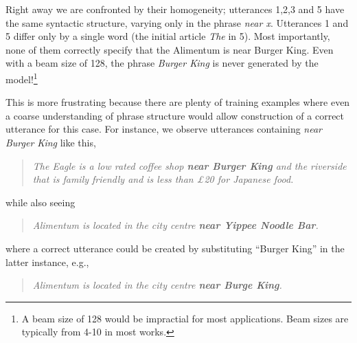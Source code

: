 \begin{enumerate}
%
\end{enumerate}
Right away we are confronted by their homogeneity; utterances 1,2,3 and 5
have the same syntactic structure, varying only in the phrase \textit{near x}.
Utterances 1 and 5 differ only by a single word (the initial article \textit{The} in 5).  Most importantly, none of them correctly specify that the Alimentum 
is near Burger King. Even with a beam size of 128, the phrase \textit{Burger King} is never generated by the model!\footnote{A beam size of 128 would be impractial for most applications. Beam sizes are typically from 4-10 in most works.}



This is more frustrating because there are plenty of training examples where
even a coarse understanding of phrase structure would allow construction
of a correct utterance for this case.
For instance, we observe utterances containing \textit{near Burger King}
like this,
\begin{quotation}
\noindent \textit{The Eagle is a low rated coffee shop \textbf{near Burger King}
and the riverside that is family friendly and is less than £20
for Japanese food.}
\end{quotation}
while also seeing
\begin{quotation}
\noindent \textit{Alimentum is located in the city centre \textbf{near Yippee Noodle Bar}. \textellipsis}
\end{quotation}
where a correct utterance could be created by substituting ``Burger King''
in the latter instance, e.g., 
\begin{quotation}
\noindent \textit{Alimentum is located in the city centre \textbf{near Burge King}.}
\end{quotation}

